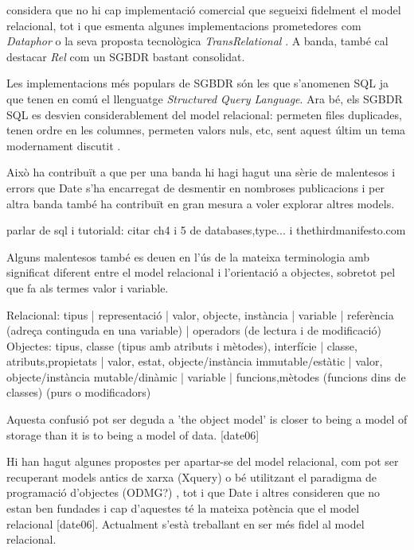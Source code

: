 \textcite[cap.~2]{date06} %
considera que no hi cap implementació comercial que segueixi fidelment el model relacional, tot i que esmenta algunes implementacions prometedores com \emph{Dataphor} o la seva proposta tecnològica \emph{TransRelational} \parencite{date:transrelational}. A banda, també cal destacar \emph{Rel} \parencite{rel} com un SGBDR  bastant consolidat.

Les implementacions més populars de SGBDR són les que s'anomenen SQL ja que tenen en comú el llenguatge \emph{Structured Query Language}. Ara bé, els SGBDR SQL es desvien considerablement del model relacional: permeten files duplicades, tenen ordre en les columnes, permeten valors nuls, etc, sent aquest últim un tema modernament discutit \parencite{date08:nulls}.

Això ha contribuït a que per una banda hi hagi hagut una sèrie de malentesos i errors que Date s'ha encarregat de desmentir en nombroses publicacions \parencite{dbdebunk,date06} i per altra banda també ha contribuït en gran mesura a voler explorar altres models.              

parlar de sql i tutoriald: citar ch4 i 5 de databases,type... i thethirdmanifesto.com



Alguns malentesos també es deuen en l'ús de la mateixa terminologia amb significat diferent entre el model relacional i l'orientació a objectes, sobretot pel que fa als termes valor i variable. 

Relacional: tipus | representació |  valor, objecte, instància  | variable  | referència (adreça continguda en una variable) | operadors (de lectura i de modificació)
Objectes: tipus, classe (tipus amb atributs i mètodes), interfície | classe, atributs,propietats  |  valor, estat, objecte/instància immutable/estàtic |  valor, objecte/instància mutable/dinàmic  | variable | funcions,mètodes (funcions dins de classes) (purs o modificadors)

Aquesta confusió pot ser deguda a 'the object model' is closer to being a model of storage than it is to being a model of data. [date06]


Hi han hagut algunes propostes per apartar-se del model relacional, com pot ser recuperant models antics de xarxa (Xquery) o bé utilitzant el paradigma de programació d'objectes (ODMG?) , tot i que Date i altres consideren que no estan ben fundades i cap d'aquestes té la mateixa potència que el model relacional [date06]. Actualment s'està treballant en ser més fidel al model relacional\parencite{date:thethirdmanifesto}. 


